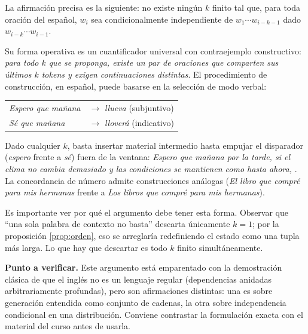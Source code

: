 \documentclass[11pt,letterpaper]{article}
\begin{document}
La afirmación precisa es la siguiente: no existe ningún $k$ finito tal que, para
toda oración del español, $w_i$ sea condicionalmente independiente de $w_1\cdots
w_{i-k-1}$ dado $w_{i-k}\cdots w_{i-1}$.

Su forma operativa es un cuantificador universal con contraejemplo constructivo:
\emph{para todo $k$ que se proponga, existe un par de oraciones que comparten
sus últimos $k$ tokens y exigen continuaciones distintas}. El procedimiento de
construcción, en español, puede basarse en la selección de modo verbal:
\begin{center}
\begin{tabular}{ll}
\emph{Espero que mañana} \underline{\hspace{1.6cm}} & $\to$ \emph{llueva}
(subjuntivo)\\
\emph{Sé que mañana} \underline{\hspace{1.6cm}} & $\to$ \emph{lloverá}
(indicativo)
\end{tabular}
\end{center}
Dado cualquier $k$, basta insertar material intermedio hasta empujar el
disparador (\emph{espero} frente a \emph{sé}) fuera de la ventana: \emph{Espero
que mañana por la tarde, si el clima no cambia demasiado y las condiciones se
mantienen como hasta ahora,} \underline{\hspace{1.6cm}}. La concordancia de
número admite construcciones análogas (\emph{El libro que compré para mis
hermanas} frente a \emph{Los libros que compré para mis hermanas}).

Es importante ver por qué el argumento debe tener esta forma. Observar que ``una
sola palabra de contexto no basta'' descarta únicamente $k=1$; por la
proposición \ref{prop:orden}, eso se arreglaría redefiniendo el estado como una
tupla más larga. Lo que hay que descartar es todo $k$ finito simultáneamente.

\begin{observacion}
\textbf{Punto a verificar.} Este argumento está emparentado con la demostración
clásica de que el inglés no es un lenguaje regular (dependencias anidadas
arbitrariamente profundas), pero son afirmaciones distintas: una es sobre
generación entendida como conjunto de cadenas, la otra sobre independencia
condicional en una distribución. Conviene contrastar la formulación exacta con
el material del curso antes de usarla.
\end{observacion}
\end{document}
